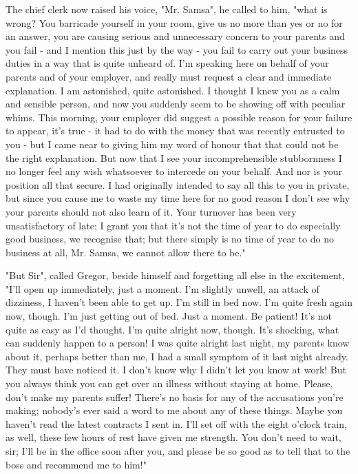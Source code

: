 \documentclass[12pt]{book}
\begin{document}
    The chief clerk now raised his voice, "Mr. Samsa", he called to him, "what is wrong? You barricade yourself in your room, give us no more than yes or no for an answer, you are causing serious and unnecessary concern to your parents and you fail - and I mention this just by the way - you fail to carry out your business duties in a way that is quite unheard of. I'm speaking here on behalf of your parents and of your employer, and really must request a clear and immediate explanation. I am astonished, quite astonished. I thought I knew you as a calm and sensible person, and now you suddenly seem to be showing off with peculiar whims. This morning, your employer did suggest a possible reason for your failure to appear, it's true - it had to do with the money that was recently entrusted to you - but I came near to giving him my word of honour that that could not be the right explanation. But now that I see your incomprehensible stubbornness I no longer feel any wish whatsoever to intercede on your behalf. And nor is your position all that secure. I had originally intended to say all this to you in private, but since you cause me to waste my time here for no good reason I don't see why your parents should not also learn of it. Your turnover has been very unsatisfactory of late; I grant you that it's not the time of year to do especially good business, we recognise that; but there simply is no time of year to do no business at all, Mr. Samsa, we cannot allow there to be."

    "But Sir", called Gregor, beside himself and forgetting all else in the excitement, "I'll open up immediately, just a moment. I'm slightly unwell, an attack of dizziness, I haven't been able to get up. I'm still in bed now. I'm quite fresh again now, though. I'm just getting out of bed. Just a moment. Be patient! It's not quite as easy as I'd thought. I'm quite alright now, though. It's shocking, what can suddenly happen to a person! I was quite alright last night, my parents know about it, perhaps better than me, I had a small symptom of it last night already. They must have noticed it. I don't know why I didn't let you know at work! But you always think you can get over an illness without staying at home. Please, don't make my parents suffer! There's no basis for any of the accusations you're making; nobody's ever said a word to me about any of these things. Maybe you haven't read the latest contracts I sent in. I'll set off with the eight o'clock train, as well, these few hours of rest have given me strength. You don't need to wait, sir; I'll be in the office soon after you, and please be so good as to tell that to the boss and recommend me to him!"
\end{document}
